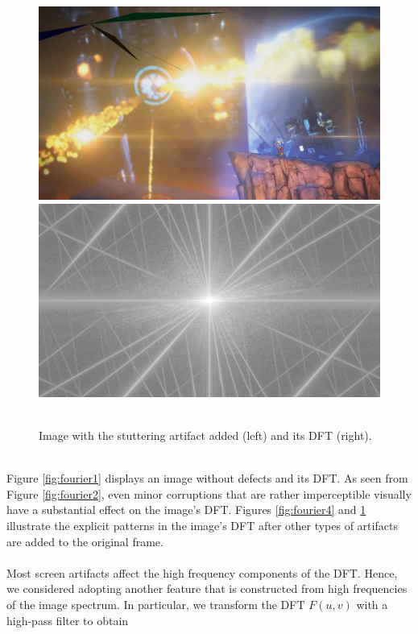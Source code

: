 \begin{figure}[H]
\centering
\includegraphics[scale=0.11]{images/0_shape.png}
\includegraphics[scale=0.11]{images/shape.png}\\\hspace{\fill}\\[-2ex]
\caption[Fourier transform on stuttering artifact]{Image with the stuttering artifact added (left) and its DFT (right).}
\label{fig:fourier3}
\end{figure}\hspace{\fill}\\
Figure \ref{fig:fourier1} displays an image without defects and its DFT. As seen from Figure \ref{fig:fourier2}, even minor corruptions that are rather imperceptible visually have a substantial effect on the image's DFT. Figures \ref{fig:fourier4} and \ref{fig:fourier3} illustrate the explicit patterns in the image's DFT after other types of artifacts are added to the original frame.\\\hspace{\fill}\\
Most screen artifacts affect the high frequency components of the DFT. Hence, we considered adopting another feature that is constructed from high frequencies of the image spectrum. In particular, we transform the DFT $F(u,v)$ with a high-pass filter to obtain 
